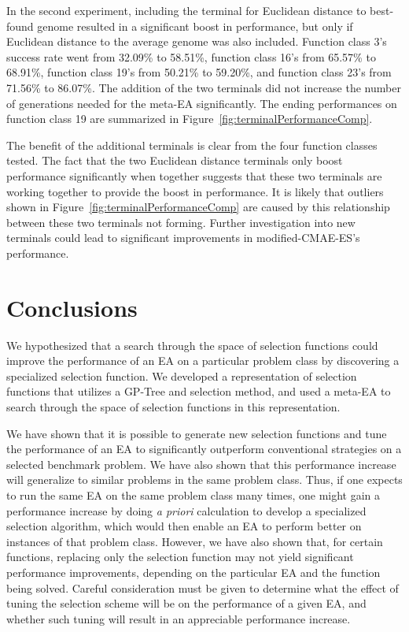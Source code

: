 \documentclass[sigconf]{acmart}
\begin{document}
In the second experiment, including the terminal for Euclidean distance to best-found genome resulted in a significant boost in performance, but only if Euclidean distance to the average genome was also included. Function class 3's success rate went from 32.09\% to 58.51\%, function class 16's from 65.57\% to 68.91\%, function class 19's from 50.21\% to 59.20\%, and function class 23's from 71.56\% to 86.07\%. The addition of the two terminals did not increase the number of generations needed for the meta-EA significantly. The ending performances on function class 19 are summarized in Figure~\ref{fig:terminalPerformanceComp}.

The benefit of the additional terminals is clear from the four function classes tested. The fact that the two Euclidean distance terminals only boost performance significantly when together suggests that these two terminals are working together to provide the boost in performance. It is likely that outliers shown in Figure~\ref{fig:terminalPerformanceComp} are caused by this relationship between these two terminals not forming. Further investigation into new terminals could lead to significant improvements in modified-CMAE-ES's performance.

\section{Conclusions}
\label{Conclusion}
We hypothesized that a search through the space of selection functions could improve the performance of an EA on a particular problem class by discovering a specialized selection function. We developed a representation of selection functions that utilizes a GP-Tree and selection method, and used a meta-EA to search through the space of selection functions in this representation. 

We have shown that it is possible to generate new selection functions and tune the performance of an EA to significantly outperform conventional strategies on a selected benchmark problem. We have also shown that this performance increase will generalize to similar problems in the same problem class. Thus, if one expects to run the same EA on the same problem class many times, one might gain a performance increase by doing \textit{a priori} calculation to develop a specialized selection algorithm, which would then enable an EA to perform better on instances of that problem class. However, we have also shown that, for certain functions, replacing only the selection function may not yield significant performance improvements, depending on the particular EA and the function being solved. Careful consideration must be given to determine what the effect of tuning the selection scheme will be on the performance of a given EA, and whether such tuning will result in an appreciable performance increase. 



\end{document}

